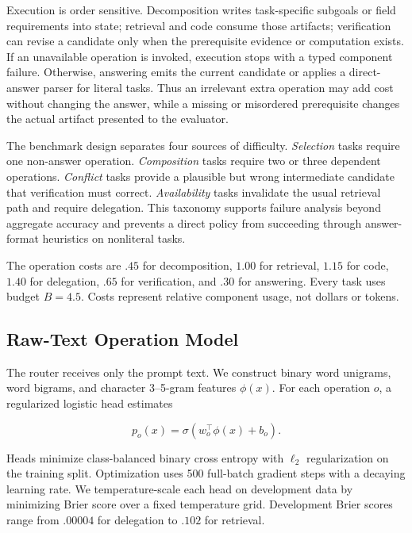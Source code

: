 \documentclass[letterpaper]{article} %
\begin{document}
Execution is order sensitive. Decomposition writes task-specific subgoals or field requirements into state; retrieval and code consume those artifacts; verification can revise a candidate only when the prerequisite evidence or computation exists. If an unavailable operation is invoked, execution stops with a typed component failure. Otherwise, answering emits the current candidate or applies a direct-answer parser for literal tasks. Thus an irrelevant extra operation may add cost without changing the answer, while a missing or misordered prerequisite changes the actual artifact presented to the evaluator.

The benchmark design separates four sources of difficulty. \emph{Selection} tasks require one non-answer operation. \emph{Composition} tasks require two or three dependent operations. \emph{Conflict} tasks provide a plausible but wrong intermediate candidate that verification must correct. \emph{Availability} tasks invalidate the usual retrieval path and require delegation. This taxonomy supports failure analysis beyond aggregate accuracy and prevents a direct policy from succeeding through answer-format heuristics on nonliteral tasks.

The operation costs are $.45$ for decomposition, $1.00$ for retrieval, $1.15$ for code, $1.40$ for delegation, $.65$ for verification, and $.30$ for answering. Every task uses budget $B=4.5$. Costs represent relative component usage, not dollars or tokens.

\subsection{Raw-Text Operation Model}

The router receives only the prompt text. We construct binary word unigrams, word bigrams, and character 3--5-gram features $\phi(x)$. For each operation $o$, a regularized logistic head estimates

\begin{equation}
p_o(x)=\sigma(w_o^\top\phi(x)+b_o).
\end{equation}

Heads minimize class-balanced binary cross entropy with $\ell_2$ regularization on the training split. Optimization uses 500 full-batch gradient steps with a decaying learning rate. We temperature-scale each head on development data by minimizing Brier score over a fixed temperature grid. Development Brier scores range from $.00004$ for delegation to $.102$ for retrieval.
\end{document}
